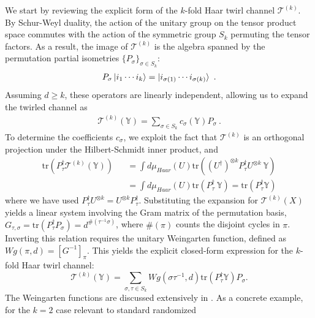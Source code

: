 \documentclass{article}
\theoremstyle{definition}
\newcommand{\Tr}{\text{tr}}
\newcommand{\nn}{\nonumber}
\newcommand{\lb}{\left(}
\newcommand{\rb}{\right)}
\begin{document}
    We start by reviewing the explicit form of the $k$-fold Haar twirl channel
    $\mathcal{T}^{(k)}$. By Schur-Weyl duality, the action of the unitary group
    on the tensor product space commutes with the action of the symmetric group
    $S_{k}$ permuting the tensor factors. As a result, the image of
    $\mathcal{T}^{(k)}$ is the algebra spanned by the permutation partial
    isometries $\{P_{\sigma}\}_{\sigma \in S_k}$:
    \begin{eqnarray}
        P_{\sigma}\ket{i_1\cdots i_k}=\ket{i_{\sigma(1)}\cdots i_{\sigma(k)}}\ .
    \end{eqnarray}
    Assuming $d \geq k$, these operators are linearly independent, allowing us to
    expand the twirled channel as
    \begin{eqnarray}
        \mathcal{T}^{(k)}(\mathbb{Y}) = \sum_{\sigma \in S_k} c_\sigma(\mathbb{Y})
        P_\sigma\ .
    \end{eqnarray}
    To determine the coefficients $c_{\sigma}$, we exploit the fact that
    $\mathcal{T}^{(k)}$ is an orthogonal projection under the Hilbert-Schmidt
    inner product, and
    \begin{eqnarray}
        \Tr(P_\tau^\dagger \mathcal{T}^{(k)}(\mathbb{Y}))&&=\int d\mu_{Haar}(U)\Tr\lb
        (U^\dagger)^{\otimes k} P_\tau^\dagger U^{\otimes k}\: \mathbb{Y}\rb\nn\\
        &&=\int d\mu_{Haar}(U)\Tr\lb P_\tau^\dagger \: \mathbb{Y}\rb=\Tr\lb P_\tau^\dagger
        \mathbb{Y}\rb
    \end{eqnarray}
    where we have used $P_{\tau}^{\dagger}U^{\otimes k}=U^{\otimes k}P_{\tau}^{\dagger}$.
    Substituting the expansion for $\mathcal{T}^{(k)}(X)$ yields a linear system
    involving the Gram matrix of the permutation basis, $G_{\tau, \sigma}= \Tr(P_{\tau}
    ^{\dagger}P_{\sigma}) = d^{\#(\tau^{-1}\sigma)}$, where $\#(\pi)$ counts the
    disjoint cycles in $\pi$. Inverting this relation requires the unitary Weingarten
    function, defined as $Wg(\pi, d) = [G^{-1}]_{\pi}$. This yields the explicit
    closed-form expression for the $k$-fold Haar twirl channel:
    \begin{equation}
        \mathcal{T}^{(k)}(\mathbb{Y}) = \sum_{\sigma, \tau \in S_k}Wg(\sigma\tau^{-1}
        , d) \Tr(P_{\tau}^{\dagger}\mathbb{Y}) P_{\sigma}. \label{eq:general_twirl}
    \end{equation}
    The Weingarten functions are discussed extensively in \cite{collins2006}. As
    a concrete example, for the $k=2$ case relevant to standard randomized
\end{document}
